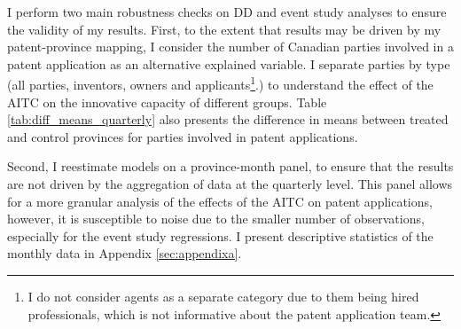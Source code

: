 \documentclass[../main.tex]{subfiles}
\begin{document}
I perform two main robustness checks on DD and event study analyses to ensure the validity of my results. First, to the extent that results may be driven by my patent-province mapping, I consider the number of Canadian parties involved in a patent application as an alternative explained variable. I separate parties by type (all parties, inventors, owners and applicants\footnote{I do not consider agents as a separate category due to them being hired professionals, which is not informative about the patent application team.}.) to understand the effect of the AITC on the innovative capacity of different groups. Table \ref{tab:diff_means_quarterly} also presents the difference in means between treated and control provinces for parties involved in patent applications.

Second, I reestimate models on a province-month panel, to ensure that the results are not driven by the aggregation of data at the quarterly level. This panel allows for a more granular analysis of the effects of the AITC on patent applications, however, it is susceptible to noise due to the smaller number of observations, especially for the event study regressions. I present descriptive statistics of the monthly data in Appendix \ref{sec:appendixa}. 
\end{document}
